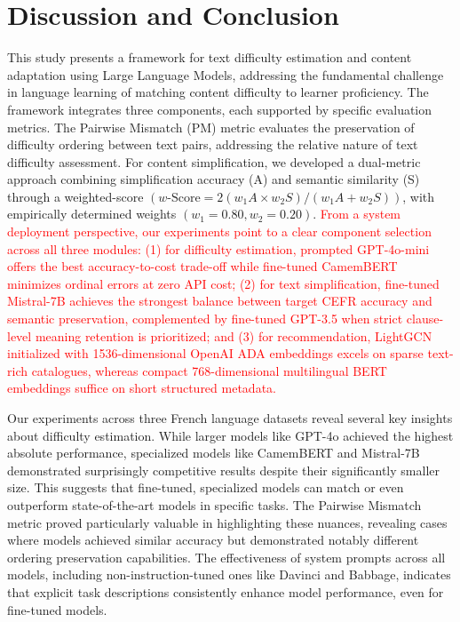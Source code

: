 \section{Discussion and Conclusion}\label{sec:discussion}

This study presents a framework for text difficulty estimation and content adaptation using Large Language Models, addressing the fundamental challenge in language learning of matching content difficulty to learner proficiency. The framework integrates three components, each supported by specific evaluation metrics. The Pairwise Mismatch (PM) metric evaluates the preservation of difficulty ordering between text pairs, addressing the relative nature of text difficulty assessment. For content simplification, we developed a dual-metric approach combining simplification accuracy (A) and semantic similarity (S) through a weighted-score $(w\text{-Score} = 2(w_1A \times w_2S)/(w_1A + w_2S))$, with empirically determined weights $(w_1 = 0.80, w_2 = 0.20)$. \textcolor{red}{From a system deployment perspective, our experiments point to a clear component selection across all three modules: (1) for difficulty estimation, prompted GPT-4o-mini offers the best accuracy-to-cost trade-off while fine-tuned CamemBERT minimizes ordinal errors at zero API cost; (2) for text simplification, fine-tuned Mistral-7B achieves the strongest balance between target CEFR accuracy and semantic preservation, complemented by fine-tuned GPT-3.5 when strict clause-level meaning retention is prioritized; and (3) for recommendation, LightGCN initialized with 1536-dimensional OpenAI ADA embeddings excels on sparse text-rich catalogues, whereas compact 768-dimensional multilingual BERT embeddings suffice on short structured metadata.}

Our experiments across three French language datasets reveal several key insights about difficulty estimation. While larger models like GPT-4o achieved the highest absolute performance, specialized models like CamemBERT and Mistral-7B demonstrated surprisingly competitive results despite their significantly smaller size. This suggests that fine-tuned, specialized models can match or even outperform state-of-the-art models in specific tasks. The Pairwise Mismatch metric proved particularly valuable in highlighting these nuances, revealing cases where models achieved similar accuracy but demonstrated notably different ordering preservation capabilities. The effectiveness of system prompts across all models, including non-instruction-tuned ones like Davinci and Babbage, indicates that explicit task descriptions consistently enhance model performance, even for fine-tuned models.

